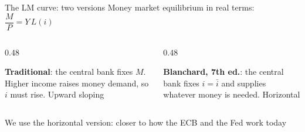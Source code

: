 \documentclass[aspectratio=169,xcolor=table]{beamer}
\begin{document}
\begin{frame}{The LM curve: two versions}
\small
Money market equilibrium in real terms: $\dfrac{M}{P} = Y\,L(i)$
\vspace{0.1cm}

\begin{columns}[T]
\begin{column}{0.48\textwidth}
\centering
{}

\footnotesize\raggedright
\textbf{Traditional}: the central bank fixes $M$. Higher income raises money demand, so $i$ must rise. Upward sloping
\end{column}
\begin{column}{0.48\textwidth}
\centering
{}

\footnotesize\raggedright
\textbf{Blanchard, 7th ed.}: the central bank fixes $i = \bar i$ and supplies whatever money is needed. Horizontal
\end{column}
\end{columns}
\vspace{0.15cm}
\small
We use the horizontal version: closer to how the ECB and the Fed work today
\end{frame}
\end{document}
